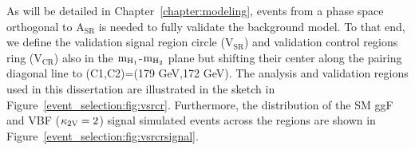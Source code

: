 As will be detailed in Chapter~\ref{chapter:modeling}, events from a phase space orthogonal to $\mathrm{A_{SR}}$ is needed to fully validate the background model. To that end, we define the validation signal region circle ($\mathrm{V_{SR}}$) and validation control regions ring ($\mathrm{V_{CR}}$) also in the $\mathrm{m_{H_{1}}}$-$\mathrm{m_{H_{2}}}$ plane but shifting their center along the pairing diagonal line to (C1,C2)=(179 GeV,172 GeV). The analysis and validation regions used in this dissertation are illustrated in the sketch in Figure~\ref{event_selection:fig:vsrcr}. Furthermore, the distribution of the SM ggF and VBF ($\mathrm{\kappa_{2V} }=2$) signal simulated events across the regions are shown in Figure~\ref{event_selection:fig:vsrcrsignal}.
\begin{figure}[htbp!]
\captionsetup[subfigure]{justification=centering}
\centering
{}
\\

\end{figure}
